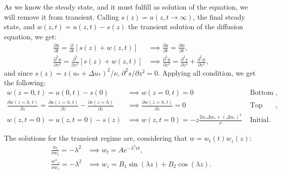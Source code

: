 \begin{anexosenv}
    As we know the steady state, and it must fulfill as solution of the equation, we will remove it from transient. Calling $s(z)=u(z,t \to \infty)$, the final steady state, and $w(z,t) = u(z,t)-s(z)$ the transient solution of the diffusion equation, we get:
    \begin{subequations}
        \begin{align}
            \frac{\partial u}{\partial t} = \frac{\partial}{\partial t}\left[s(z)+w(z,t)\right] & \implies \frac{\partial u}{\partial t} = \frac{\partial w}{\partial t} ,\\
            \frac{\partial^2 u}{\partial z^2} = \frac{\partial^2 }{\partial z^2}\left[s(z)+w(z,t)\right] & \implies \frac{\partial^2 u}{\partial z^2} = \frac{\partial^2 s}{\partial z^2} + \frac{\partial^2 w}{\partial z^2},
        \end{align}
    \end{subequations}
and since $s(z)=z (u_*+\Delta u_*)^2/\nu$, $\partial^2 s/\partial z^2 = 0$. Applying all condition, we get the following:
    \begin{subequations}
        \begin{align}
            w(z=0,t) = u(0,t)-s(0) & \implies w(z=0,t) = 0 & \text{ Bottom wall}, \\
            \frac{\partial w(z=h,t)}{\partial z} = \frac{\partial u(z=h,t)}{\partial z} -\frac{\partial s(z=h)}{\partial z} & \implies \frac{\partial w(z=h,t)}{\partial z} = 0 & \text{ Top shear}, \\
            w(z,t=0) = u(z,t=0) -s(z) & \implies w(z,t=0) = -z\frac{2u_*\Delta u_* +\left(\Delta u_*\right)^2}{\nu} & \text{ Initial}.
        \end{align}
    \end{subequations}

    The solutions for the transient regime are, considering that $w=w_t(t) w_z(z)$:
    \begin{subequations}
        \begin{align}
            \frac{\dot{w}_t}{\nu w_t} = -\lambda^2 & \implies w_t = Ae^{-\lambda^2 \nu t}, \\
            \frac{{w''}_z}{\nu w_z} = -\lambda^2 & \implies w_z = B_1 \sin \left(\lambda z\right) + B_2 \cos \left(\lambda z\right).
        \end{align}
    \end{subequations}


\end{anexosenv}
